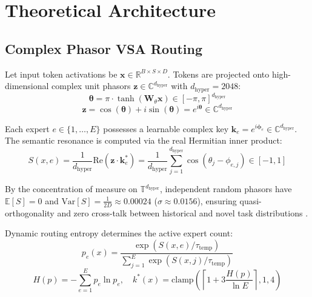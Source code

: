\documentclass[10pt,twocolumn,letterpaper]{article}
\begin{document}
\section{Theoretical Architecture}

\subsection{Complex Phasor VSA Routing}
Let input token activations be $\mathbf{x} \in \mathbb{R}^{B \times S \times D}$. Tokens are projected onto high-dimensional complex unit phasors $\mathbf{z} \in \mathbb{C}^{d_{\text{hyper}}}$ with $d_{\text{hyper}} = 2048$:
\begin{equation}
\mathbf{\theta} = \pi \cdot \tanh(\mathbf{W}_\theta \mathbf{x}) \in [-\pi, \pi]^{d_{\text{hyper}}}
\end{equation}
\begin{equation}
\mathbf{z} = \cos(\mathbf{\theta}) + i \sin(\mathbf{\theta}) = e^{i \mathbf{\theta}} \in \mathbb{C}^{d_{\text{hyper}}}
\end{equation}

Each expert $e \in \{1, \dots, E\}$ possesses a learnable complex key $\mathbf{k}_e = e^{i \mathbf{\phi}_e} \in \mathbb{C}^{d_{\text{hyper}}}$. The semantic resonance is computed via the real Hermitian inner product:
\begin{equation}
S(x, e) = \frac{1}{d_{\text{hyper}}} \text{Re}(\mathbf{z} \cdot \mathbf{k}_e^*) = \frac{1}{d_{\text{hyper}}} \sum_{j=1}^{d_{\text{hyper}}} \cos(\theta_j - \phi_{e, j}) \in [-1, 1]
\end{equation}

By the concentration of measure on $\mathbb{T}^{d_{\text{hyper}}}$, independent random phasors have $\mathbb{E}[S] = 0$ and $\text{Var}[S] = \frac{1}{2 D} \approx 0.00024$ ($\sigma \approx 0.0156$), ensuring quasi-orthogonality and zero cross-talk between historical and novel task distributions \cite{kanerva2009, plate2003}.

Dynamic routing entropy determines the active expert count:
\begin{equation}
p_e(x) = \frac{\exp(S(x, e) / \tau_{\text{temp}})}{\sum_{j=1}^E \exp(S(x, j) / \tau_{\text{temp}})}
\end{equation}
\begin{equation}
H(p) = -\sum_{e=1}^E p_e \ln p_e, \quad k^*(x) = \text{clamp}\left( \left\lceil 1 + 3 \frac{H(p)}{\ln E} \right\rceil, 1, 4 \right)
\end{equation}
\end{document}
